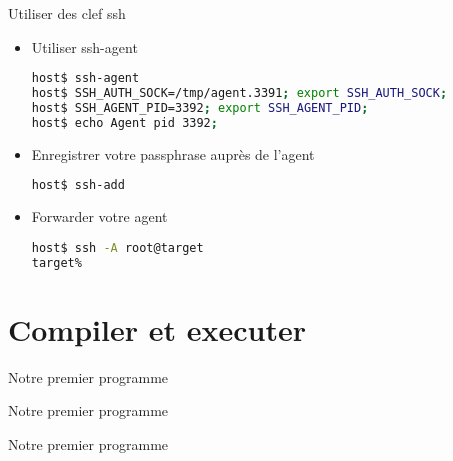 \begin{frame}[fragile=singleslide]{Utiliser des clef ssh}
  \begin{itemize}
  \item Utiliser ssh-agent
\begin{lstlisting}[language=sh]
host$ ssh-agent
host$ SSH_AUTH_SOCK=/tmp/agent.3391; export SSH_AUTH_SOCK;
host$ SSH_AGENT_PID=3392; export SSH_AGENT_PID;
host$ echo Agent pid 3392;
\end{lstlisting} %
  \item Enregistrer votre passphrase auprès de l'agent
\begin{lstlisting}[language=sh]
host$ ssh-add
\end{lstlisting} %
  \item Forwarder votre agent
\begin{lstlisting}[language=sh]
host$ ssh -A root@target
target% 
\end{lstlisting} %
  \end{itemize}
\end{frame}


\section{Compiler et executer}

\begin{frame}[fragile=singleslide]{Notre premier programme}{}
  
\end{frame}

\begin{frame}[fragile=singleslide]{Notre premier programme}{}
  
\end{frame}

\begin{frame}[fragile=singleslide]{Notre premier programme}{}
  
\end{frame}

